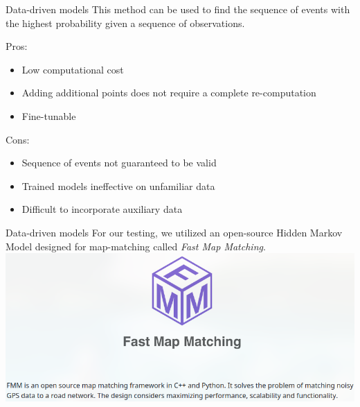 \documentclass[aspectratio=169, bigfiles, professionalfonts, hyperref={colorlinks=true, allcolors=., urlcolor=blue}]{beamer}
\begin{document}
\begin{frame}{Data-driven models}
	This method can be used to find the sequence of events with the highest probability given a sequence of observations.\\[3em]
	\noindent\begin{minipage}[t]{.49\textwidth}
    \begin{tcolorbox}[colframe=yellow,
    colback=yellow!10!white,
    colbacktitle=yellow!40!white,
    coltitle=black, fonttitle=\bfseries]
	Pros:
\begin{itemize}
	\item Low computational cost	
	\item Adding additional points does not require a complete re-computation
	\item Fine-tunable
\end{itemize}
\vspace{4mm}
\end{tcolorbox}
\end{minipage}\hfill
\noindent\begin{minipage}[t]{.49\textwidth}
    \begin{tcolorbox}[colframe=yellow,
    colback=yellow!10!white,
    colbacktitle=yellow!40!white,
    coltitle=black, fonttitle=\bfseries]
Cons:
\begin{itemize}
	\item Sequence of events not guaranteed to be valid
	\item Trained models ineffective on unfamiliar data
	\item Difficult to incorporate auxiliary data
\end{itemize}
\end{tcolorbox}
\end{minipage}
\end{frame}

\begin{frame}{Data-driven models}
	For our testing, we utilized an open-source Hidden Markov Model designed for map-matching called \textit{Fast Map Matching}.
	\centering
	\includegraphics[scale=0.5]{fmmlogo.png}
\end{frame}
\end{document}
